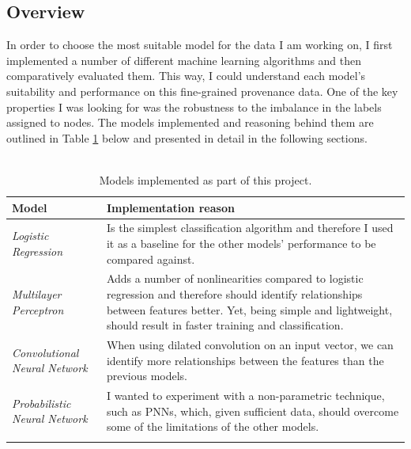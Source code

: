 	\subsection{Overview} \label{Section: impl/ml/overview}
	In order to choose the most suitable model for the data I am working on, I first implemented a number of different machine learning algorithms and then comparatively evaluated them. This way, I could understand each model's suitability and performance on this fine-grained provenance data. One of the key properties I was looking for was the robustness to the imbalance in the labels assigned to nodes. The models implemented and reasoning behind them are outlined in Table \ref{Table: impl/ml/overview/models} below and presented in detail in the following sections.
	\\ \\
	\begin{longtable}{|p{}|p{}|}
		\textbf{Model} & \textbf{Implementation reason} \\
		\hline
		\textit{Logistic Regression} & Is the simplest classification algorithm and therefore I used it as a baseline for the other models' performance to be compared against. \\
		\hline 
		\textit{Multilayer Perceptron} & Adds a number of nonlinearities compared to logistic regression and therefore should identify relationships between features better. Yet, being simple and lightweight, should result in faster training and classification. \\
		\hline
		\textit{Convolutional Neural Network} & When using dilated convolution on an input vector, we can identify more relationships between the features than the previous models. \\
		\hline
		\textit{Probabilistic Neural Network} & I wanted to experiment with a non-parametric technique, such as PNNs, which, given sufficient data, should overcome some of the limitations of the other models. \\
		\hline
		\caption{Models implemented as part of this project.}
		\label{Table: impl/ml/overview/models}
	\end{longtable}

